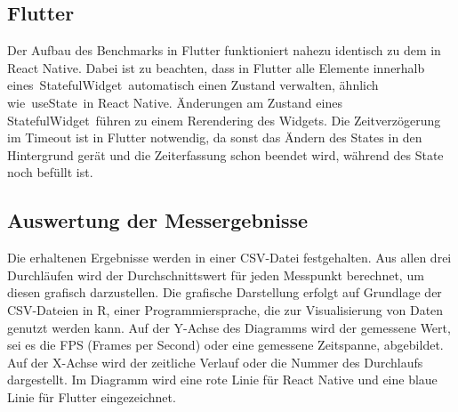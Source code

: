 \subsection*{Flutter}
Der Aufbau des Benchmarks in Flutter funktioniert nahezu identisch zu dem in React Native. Dabei ist zu beachten, dass in Flutter alle Elemente innerhalb eines StatefulWidget automatisch einen Zustand verwalten, ähnlich wie useState in React Native. Änderungen am Zustand eines StatefulWidget führen zu einem Rerendering des Widgets. Die Zeitverzögerung im Timeout ist in Flutter notwendig, da sonst das Ändern des States in den Hintergrund gerät und die Zeiterfassung schon beendet wird, während des State noch befüllt ist.

\newpage
\subsection{Auswertung der Messergebnisse}
Die erhaltenen Ergebnisse werden in einer CSV-Datei festgehalten. Aus allen drei Durchläufen wird der Durchschnittswert für jeden Messpunkt berechnet, um diesen grafisch darzustellen. Die grafische Darstellung erfolgt auf Grundlage der CSV-Dateien in R, einer Programmiersprache, die zur Visualisierung von Daten genutzt werden kann. Auf der Y-Achse des Diagramms wird der gemessene Wert, sei es die FPS (Frames per Second) oder eine gemessene Zeitspanne, abgebildet. Auf der X-Achse wird der zeitliche Verlauf oder die Nummer des Durchlaufs dargestellt. Im Diagramm wird eine rote Linie für React Native und eine blaue Linie für Flutter eingezeichnet.
